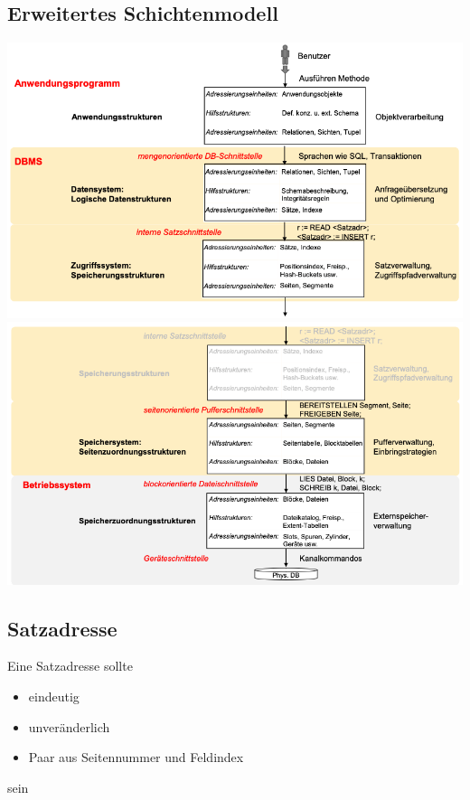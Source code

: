 \subsection{Erweitertes Schichtenmodell}
\begin{center}
\includegraphics[scale=0.5]{images/Schichtenmodell_erweitert_2.png}
\includegraphics[scale=0.5]{images/Schichtenmodell_erweitert_1.png}
\end{center}
\subsection{Satzadresse}
Eine Satzadresse sollte
\begin{itemize}
	\item eindeutig
	\item unveränderlich
	\item Paar aus Seitennummer und Feldindex
\end{itemize}
sein